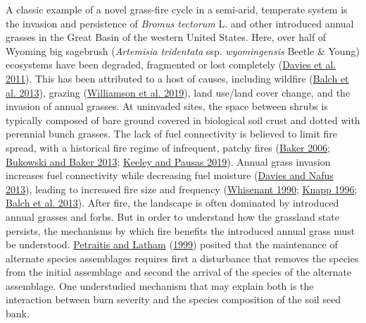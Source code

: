 \documentclass[
  12pt,
]{article}
\begin{document}
A classic example of a novel grass-fire cycle in a semi-arid, temperate
system is the invasion and persistence of \emph{Bromus tectorum} L. and
other introduced annual grasses in the Great Basin of the western United
States. Here, over half of Wyoming big sagebrush (\emph{Artemisia
tridentata} ssp. \emph{wyomingensis} Beetle \& Young) ecosystems have
been degraded, fragmented or lost completely
(\protect\hyperlink{ref-Davies2011}{Davies et al. 2011}). This has been
attributed to a host of causes, including wildfire
(\protect\hyperlink{ref-Balch2013}{Balch et al. 2013}), grazing
(\protect\hyperlink{ref-Williamson2019}{Williamson et al. 2019}), land
use/land cover change, and the invasion of annual grasses. At uninvaded
sites, the space between shrubs is typically composed of bare ground
covered in biological soil crust and dotted with perennial bunch
grasses. The lack of fuel connectivity is believed to limit fire spread,
with a historical fire regime of infrequent, patchy fires
(\protect\hyperlink{ref-Baker2006}{Baker 2006};
\protect\hyperlink{ref-Bukowski2013}{Bukowski and Baker 2013};
\protect\hyperlink{ref-Keeley2019}{Keeley and Pausas 2019}). Annual
grass invasion increases fuel connectivity while decreasing fuel
moisture (\protect\hyperlink{ref-Davies2013}{Davies and Nafus 2013}),
leading to increased fire size and frequency
(\protect\hyperlink{ref-Whisenant1990}{Whisenant 1990};
\protect\hyperlink{ref-Knapp1996}{Knapp 1996};
\protect\hyperlink{ref-Balch2013}{Balch et al. 2013}). After fire, the
landscape is often dominated by introduced annual grasses and forbs. But
in order to understand how the grassland state persists, the mechanisms
by which fire benefits the introduced annual grass must be understood.
\protect\hyperlink{ref-Petraitis1999}{Petraitis and Latham}
(\protect\hyperlink{ref-Petraitis1999}{1999}) posited that the
maintenance of alternate species assemblages requires first a
disturbance that removes the species from the initial assemblage and
second the arrival of the species of the alternate assemblage. One
understudied mechanism that may explain both is the interaction between
burn severity and the species composition of the soil seed bank.
\end{document}
